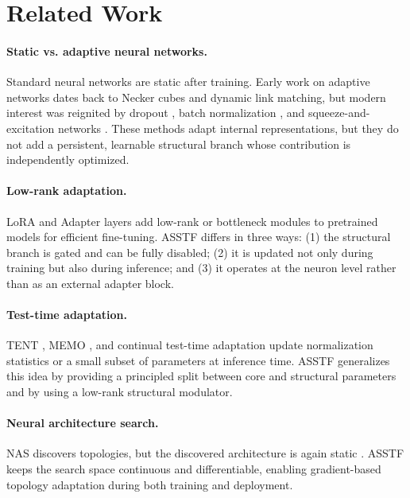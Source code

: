 \documentclass[11pt,a4paper]{article}
\theoremstyle{definition}
\begin{document}
\section{Related Work}
\label{sec:related}

\paragraph{Static vs.	adaptive neural networks.} Standard neural networks are static after training. Early work on adaptive networks dates back to Necker cubes and dynamic link matching, but modern interest was reignited by dropout \cite{srivastava2014dropout}, batch normalization \cite{ioffe2015batch}, and squeeze-and-excitation networks \cite{hu2018squeeze}. These methods adapt internal representations, but they do not add a persistent, learnable structural branch whose contribution is independently optimized.

\paragraph{Low-rank adaptation.} LoRA \cite{hu2021lora} and Adapter layers \cite{houlsby2019parameter} add low-rank or bottleneck modules to pretrained models for efficient fine-tuning. ASSTF differs in three ways: (1) the structural branch is gated and can be fully disabled; (2) it is updated not only during training but also during inference; and (3) it operates at the neuron level rather than as an external adapter block.

\paragraph{Test-time adaptation.} TENT \cite{wang2020tent}, MEMO \cite{zhang2022memo}, and continual test-time adaptation \cite{wang2021continual} update normalization statistics or a small subset of parameters at inference time. ASSTF generalizes this idea by providing a principled split between core and structural parameters and by using a low-rank structural modulator.

\paragraph{Neural architecture search.} NAS discovers topologies, but the discovered architecture is again static \cite{elsken2019neural}. ASSTF keeps the search space continuous and differentiable, enabling gradient-based topology adaptation during both training and deployment.
\end{document}

